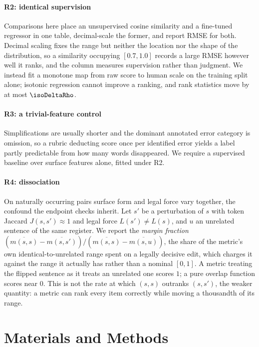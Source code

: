 \documentclass{BVP_JCLLT}
\begin{document}
\paragraph{R2: identical supervision}
Comparisons here place an unsupervised cosine similarity and a fine-tuned
regressor in one table, decimal-scale the former, and report RMSE for both.
Decimal scaling fixes the range but neither the location nor the shape of the
distribution, so a similarity occupying $[0.7,1.0]$ records a large RMSE however
well it ranks, and the column measures supervision rather than judgment.
We instead fit a monotone map from raw score to human scale on the training
split alone; isotonic regression cannot improve a ranking, and rank statistics
move by at most $\isoDeltaRho$.

\paragraph{R3: a trivial-feature control}
Simplifications are usually shorter and the dominant annotated error category is
omission, so a rubric deducting score once per identified error yields a label
partly predictable from how many words disappeared. We require a supervised
baseline over surface features alone, fitted under R2.

\paragraph{R4: dissociation}
On naturally occurring pairs surface form and legal force vary together, the
confound the endpoint checks inherit. Let $s'$ be a perturbation of $s$ with
token Jaccard $J(s,s') \approx 1$ and legal force $L(s') \neq L(s)$, and $u$ an
unrelated sentence of the same register. We report the \emph{margin fraction}
$(\overline{m(s,s)} - \overline{m(s,s')}) /
 (\overline{m(s,s)} - \overline{m(s,u)})$, the share of the metric's own
identical-to-unrelated range spent on a legally decisive edit, which charges it
against the range it actually has rather than a nominal $[0,1]$. A metric
treating the flipped sentence as it treats an unrelated one scores $1$; a pure
overlap function scores near $0$. This is not the rate at which $(s,s)$ outranks
$(s,s')$, the weaker quantity: a metric can rank every item correctly while
moving a thousandth of its range.

\section{Materials and Methods}\label{sec:methods}
\end{document}
